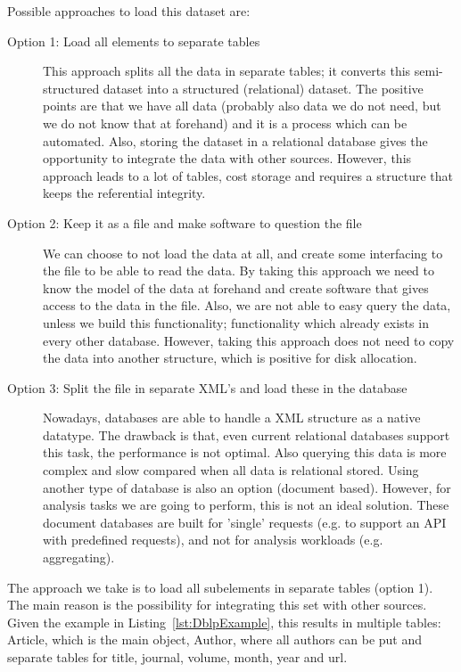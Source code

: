\documentclass{ou-report}
\begin{document}
\newpage
Possible approaches to load this dataset are:
\begin{description}
\item[Option 1: Load all elements to separate tables] This approach splits all 
the data in separate tables; it converts this semi-structured dataset into a 
structured (relational) dataset. The positive points are that we have all data 
(probably also data we do not need, but we do not know that at forehand) and it 
is a process which can be automated. Also, storing the dataset in a 
relational database gives the opportunity to integrate the data with other 
sources. However, this approach leads to a lot of tables, cost storage and 
requires a structure that keeps the referential integrity.
\item[Option 2: Keep it as a file and make software to question the file] We can 
choose to not load the data at all, and create some interfacing to the file to 
be able to read the data. By taking this approach we need to know the model of 
the data at forehand and create software that gives access to the data in the 
file. Also, we are not able to easy query the data, unless we build this 
functionality; functionality which already exists in \mbox{every} other database. 
However, taking this approach does not need to copy the data into another 
structure, which is positive for disk allocation.
\item[Option 3: Split the file in separate XML's and load these in the database] 
Nowadays, databases are able to handle a XML structure as a native datatype. The 
drawback is that, even current relational databases support this task, the 
performance is not optimal. Also querying this data is more complex and slow 
compared when all data is relational stored. Using another type of database is also 
an option (document based). However, for analysis tasks we are going to perform, 
this is not an ideal solution. These document databases are built for 'single' 
requests (e.g. to support an API with predefined requests), and not for 
analysis workloads (e.g. aggregating).
\end{description}
The approach we take is to load all subelements in separate tables (option 1).
The main reason is the possibility for integrating 
this set with other sources. Given the example in Listing~\ref{lst:DblpExample}, 
this results in multiple tables: Article, which is the main object, Author, 
where all authors can be put and separate tables for title, journal, volume, 
month, year and url.
\end{document}
